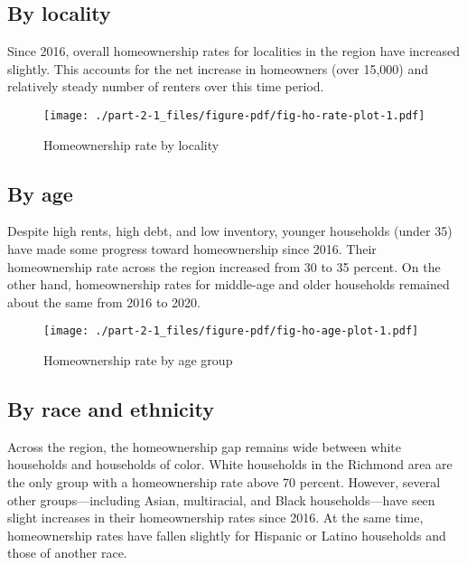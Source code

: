 \documentclass[
  letterpaper,
  DIV=11,
  numbers=noendperiod]{scrreprt}
\begin{document}
\hypertarget{by-locality}{%
\subsection{By locality}\label{by-locality}}

Since 2016, overall homeownership rates for localities in the region
have increased slightly. This accounts for the net increase in
homeowners (over 15,000) and relatively steady number of renters over
this time period.

\begin{figure}

{\centering \texttt{[image: ./part-2-1\_files/figure-pdf/fig-ho-rate-plot-1.pdf]}

}

\caption{\label{fig-ho-rate-plot}Homeownership rate by locality}

\end{figure}

\hypertarget{by-age-1}{%
\subsection{By age}\label{by-age-1}}

Despite high rents, high debt, and low inventory, younger households
(under 35) have made some progress toward homeownership since 2016.
Their homeownership rate across the region increased from 30 to 35
percent. On the other hand, homeownership rates for middle-age and older
households remained about the same from 2016 to 2020.

\begin{figure}

{\centering \texttt{[image: ./part-2-1\_files/figure-pdf/fig-ho-age-plot-1.pdf]}

}

\caption{\label{fig-ho-age-plot}Homeownership rate by age group}

\end{figure}

\hypertarget{by-race-and-ethnicity}{%
\subsection{By race and ethnicity}\label{by-race-and-ethnicity}}

Across the region, the homeownership gap remains wide between white
households and households of color. White households in the Richmond
area are the only group with a homeownership rate above 70 percent.
However, several other groups---including Asian, multiracial, and Black
households---have seen slight increases in their homeownership rates
since 2016. At the same time, homeownership rates have fallen slightly
for Hispanic or Latino households and those of another race.
\end{document}
